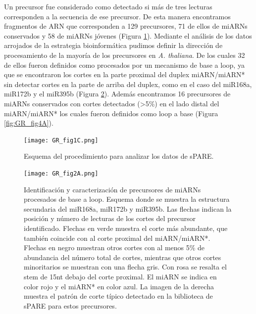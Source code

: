 Un precursor fue considerado como detectado si más de tres lecturas corresponden a la secuencia de ese precursor.
De esta manera encontramos fragmentos de ARN que corresponden a 129 precursores, 71 de ellos de miARNs conservados y 58 de miARNs jóvenes (Figura \ref{fig:GR_fig1C}).
Mediante el análisis de los datos arrojados de la estrategia bioinformática pudimos definir la dirección de procesamiento de la mayoría de los precursores en \textit{A. thaliana}.
De los cuales 32 de ellos fueron definidos como procesados por un mecanismo de base a loop, ya que se encontraron los cortes en la parte proximal del duplex miARN/miARN* sin detectar cortes en la parte de arriba del duplex, como en el caso del miR168a, miR172b y el miR395b (Figura \ref{fig:GR_fig2A}).
Además encontramos 16 precursores de miARNs conservados con cortes detectados (>5\%) en el lado distal del miARN/miARN* los cuales fueron definidos como loop a base (Figura \ref{fig:GR_fig4A}).

\begin{figure}[htbp!] 
    \centering    
    \texttt{[image: GR\_fig1C.png]}
    \caption[Esquema del procedimiento para analizar los datos de sPARE]{Esquema del procedimiento para analizar los datos de sPARE.}
    \label{fig:GR_fig1C}
\end{figure}

\begin{figure}[htbp!] 
    \centering    
    \texttt{[image: GR\_fig2A.png]}
    \caption[Identificación y caracterización de precursores de miARNs procesados de base a loop]{Identificación y caracterización de precursores de miARNs procesados de base a loop.
            Esquema donde se muestra la estructura secundaria del miR168a, miR172b y miR395b.
            Las flechas indican la posición y número de lecturas de los cortes del precursor identificado.
            Flechas en verde muestra el corte más abundante, que también coincide con al corte proximal del miARN/miARN*.
            Flechas en negro muestran otros cortes con al menos 5\% de abundancia del número total de cortes, mientras que otros cortes minoritarios se muestran con una flecha gris.
            Con rosa se resalta el stem de 15nt debajo del corte proximal.
            El miARN se indica en color rojo y el miARN* en color azul.
            La imagen de la derecha muestra el patrón de corte típico detectado en la biblioteca de sPARE para estos precursores.}
    \label{fig:GR_fig2A}
\end{figure}


